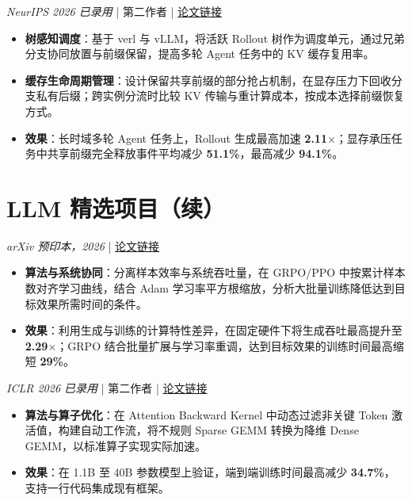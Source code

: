 \documentclass{resume}
\begin{document}
\textit{NeurIPS 2026 已录用} \quad | \quad 第二作者 \quad | \quad \href{https://openreview.net/forum?id=FPJ4b4JwEE}{论文链接}
\begin{itemize}
  \item \textbf{树感知调度}：基于 verl 与 vLLM，将活跃 Rollout 树作为调度单元，通过兄弟分支协同放置与前缀保留，提高多轮 Agent 任务中的 KV 缓存复用率。
  \item \textbf{缓存生命周期管理}：设计保留共享前缀的部分抢占机制，在显存压力下回收分支私有后缀；跨实例分流时比较 KV 传输与重计算成本，按成本选择前缀恢复方式。
  \item \textbf{效果}：长时域多轮 Agent 任务上，Rollout 生成最高加速 \textbf{2.11$\times$}；显存承压任务中共享前缀完全释放事件平均减少 \textbf{51.1\%}，最高减少 \textbf{94.1\%}。
\end{itemize}

\newpage
\section{LLM 精选项目（续）}
\textit{arXiv 预印本，2026} \quad | \quad \href{https://arxiv.org/abs/2608.29296}{论文链接}
\begin{itemize}
  \item \textbf{算法与系统协同}：分离样本效率与系统吞吐量，在 GRPO/PPO 中按累计样本数对齐学习曲线，结合 Adam 学习率平方根缩放，分析大批量训练降低达到目标效果所需时间的条件。
  \item \textbf{效果}：利用生成与训练的计算特性差异，在固定硬件下将生成吞吐最高提升至 \textbf{2.29$\times$}；GRPO 结合批量扩展与学习率重调，达到目标效果的训练时间最高缩短 \textbf{29\%}。
\end{itemize}
\vspace{0.1cm}

\textit{ICLR 2026 已录用} \quad | \quad 第二作者 \quad | \quad \href{https://openreview.net/forum?id=eshXwEnENV}{论文链接}
\begin{itemize}
  \item \textbf{算法与算子优化}：在 Attention Backward Kernel 中动态过滤非关键 Token 激活值，构建自动工作流，将不规则 Sparse GEMM 转换为降维 Dense GEMM，以标准算子实现实际加速。
  \item \textbf{效果}：在 1.1B 至 40B 参数模型上验证，端到端训练时间最高减少 \textbf{34.7\%}，支持一行代码集成现有框架。
\end{itemize}
\end{document}
